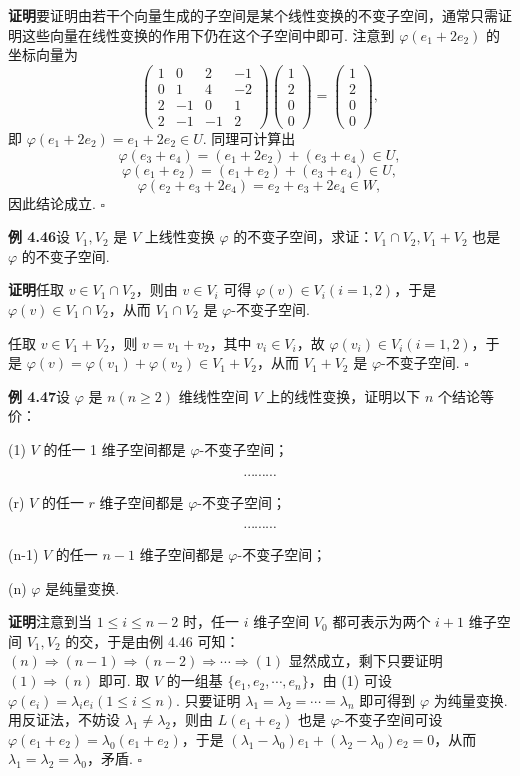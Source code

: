 \documentclass[UTF8, 12pt, fontset=fandol, oneside]{ctexart}
\begin{document}
\noindent\textbf{证明}\quad 要证明由若干个向量生成的子空间是某个线性变换的不变子空间，通常只需证明这些向量在线性变换的作用下仍在这个子空间中即可. 注意到 $\varphi(e_1+2e_2)$ 的坐标向量为
\[
\left(\begin{array}{rrrr}
1 & 0 & 2 & -1\\
0 & 1 & 4 & -2\\
2 & -1 & 0 & 1\\
2 & -1 & -1 & 2
\end{array}\right)
\left(\begin{array}{c}1\\2\\0\\0\end{array}\right)
=
\left(\begin{array}{c}1\\2\\0\\0\end{array}\right),
\]
即 $\varphi(e_1+2e_2)=e_1+2e_2\in U$. 同理可计算出
\[
\varphi(e_3+e_4)=(e_1+2e_2)+(e_3+e_4)\in U,
\]
\[
\varphi(e_1+e_2)=(e_1+e_2)+(e_3+e_4)\in U,
\]
\[
\varphi(e_2+e_3+2e_4)=e_2+e_3+2e_4\in W,
\]
因此结论成立. $\square$

\noindent\textbf{例 4.46}\quad 设 $V_1,V_2$ 是 $V$ 上线性变换 $\varphi$ 的不变子空间，求证：$V_1\cap V_2,V_1+V_2$ 也是 $\varphi$ 的不变子空间.

\noindent\textbf{证明}\quad 任取 $v\in V_1\cap V_2$，则由 $v\in V_i$ 可得 $\varphi(v)\in V_i(i=1,2)$，于是 $\varphi(v)\in V_1\cap V_2$，从而 $V_1\cap V_2$ 是 $\varphi$-不变子空间.

任取 $v\in V_1+V_2$，则 $v=v_1+v_2$，其中 $v_i\in V_i$，故 $\varphi(v_i)\in V_i(i=1,2)$，于是 $\varphi(v)=\varphi(v_1)+\varphi(v_2)\in V_1+V_2$，从而 $V_1+V_2$ 是 $\varphi$-不变子空间. $\square$

\noindent\textbf{例 4.47}\quad 设 $\varphi$ 是 $n(n\ge2)$ 维线性空间 $V$ 上的线性变换，证明以下 $n$ 个结论等价：

(1) $V$ 的任一 1 维子空间都是 $\varphi$-不变子空间；

\[
\cdots\cdots\cdots
\]

(r) $V$ 的任一 $r$ 维子空间都是 $\varphi$-不变子空间；

\[
\cdots\cdots\cdots
\]

(n-1) $V$ 的任一 $n-1$ 维子空间都是 $\varphi$-不变子空间；

(n) $\varphi$ 是纯量变换.

\noindent\textbf{证明}\quad 注意到当 $1\le i\le n-2$ 时，任一 $i$ 维子空间 $V_0$ 都可表示为两个 $i+1$ 维子空间 $V_1,V_2$ 的交，于是由例 4.46 可知：$(n)\Rightarrow(n-1)\Rightarrow(n-2)\Rightarrow\cdots\Rightarrow(1)$ 显然成立，剩下只要证明 $(1)\Rightarrow(n)$ 即可. 取 $V$ 的一组基 $\{e_1,e_2,\cdots,e_n\}$，由 (1) 可设 $\varphi(e_i)=\lambda_ie_i(1\le i\le n)$. 只要证明 $\lambda_1=\lambda_2=\cdots=\lambda_n$ 即可得到 $\varphi$ 为纯量变换. 用反证法，不妨设 $\lambda_1\ne\lambda_2$，则由 $L(e_1+e_2)$ 也是 $\varphi$-不变子空间可设 $\varphi(e_1+e_2)=\lambda_0(e_1+e_2)$，于是 $(\lambda_1-\lambda_0)e_1+(\lambda_2-\lambda_0)e_2=0$，从而 $\lambda_1=\lambda_2=\lambda_0$，矛盾. $\square$
\end{document}

